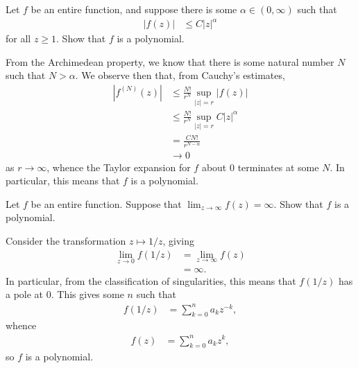 \documentclass[10pt]{mypackage}
\begin{document}
\begin{problem}[Problem 2]
  Let $f$ be an entire function, and suppose there is some $\alpha\in \left( 0,\infty \right)$ such that
  \begin{align*}
    \left\vert f(z) \right\vert &\leq C\left\vert z \right\vert^{\alpha}
  \end{align*}
  for all $z\geq 1$. Show that $f$ is a polynomial.
\end{problem}
\begin{solution}
  From the Archimedean property, we know that there is some natural number $N$ such that $N > \alpha$. We observe then that, from Cauchy's estimates,
  \begin{align*}
    \left\vert f^{(N)}\left( z \right) \right\vert &\leq \frac{N!}{r^{N}} \sup_{|z| = r} \left\vert f(z) \right\vert\\
                                                   &\leq \frac{N!}{r^{N}} \sup_{|z| = r}C\left\vert z \right\vert^{\alpha}\\
                                                   &= \frac{CN!}{r^{N-\alpha}}\\
                                                   &\rightarrow 0
  \end{align*}
  as $r\rightarrow\infty$, whence the Taylor expansion for $f$ about $0$ terminates at some $N$. In particular, this means that $f$ is a polynomial.
\end{solution}
\begin{problem}[Problem 3]
  Let $f$ be an entire function. Suppose that $\lim_{z\rightarrow\infty}f(z) = \infty$. Show that $f$ is a polynomial.
\end{problem}
\begin{solution}
  Consider the transformation $z\mapsto 1/z$, giving
  \begin{align*}
    \lim_{z\rightarrow 0} f\left(1/z\right) &= \lim_{z\rightarrow\infty} f(z)\\
                               &= \infty.
  \end{align*}
  In particular, from the classification of singularities, this means that $f\left( 1/z \right)$ has a pole at $0$. This gives some $n$ such that
  \begin{align*}
    f\left( 1/z \right) &= \sum_{k=0}^{n} a_k z^{-k},
  \end{align*}
  whence
  \begin{align*}
    f(z) &= \sum_{k=0}^{n} a_kz^{k},
  \end{align*}
  so $f$ is a polynomial.
\end{solution}
\end{document}

